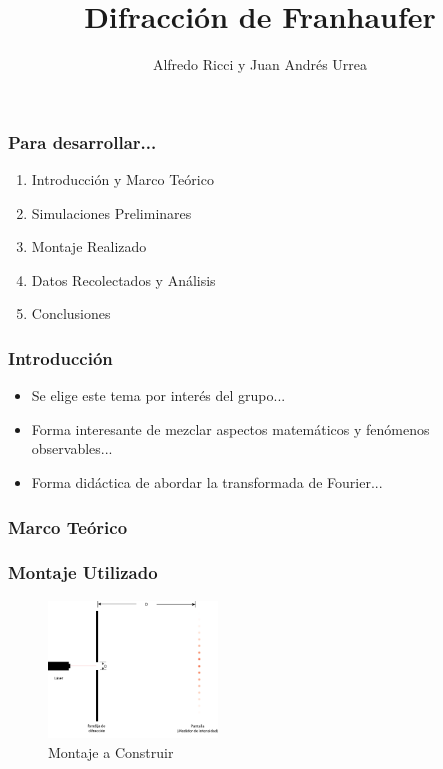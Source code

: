 \documentclass[12pt]{beamer}
\title{Difracción de Franhaufer}
\author{Alfredo Ricci y Juan Andrés Urrea}
\begin{document}
\frame{\titlepage}
\begin{frame}
\frametitle{Para desarrollar...}
\begin{block}{}
\begin{enumerate}
\item Introducción y Marco Teórico \pause
\item Simulaciones Preliminares \pause
\item Montaje Realizado \pause
\item Datos Recolectados y Análisis \pause
\item Conclusiones
\end{enumerate}
\end{block}
\end{frame}

\begin{frame}
\frametitle{Introducción}
\begin{block}{}
\begin{itemize}
\item Se elige este tema por interés del grupo... \pause
\item Forma interesante de mezclar aspectos matemáticos y fenómenos observables... \pause
\item Forma didáctica de abordar la transformada de Fourier...
\end{itemize}
\end{block}
\end{frame}

\begin{frame}
\frametitle{Marco Teórico}
\end{frame}

\begin{frame}
\frametitle{Montaje Utilizado}

\begin{figure}[htb]
\centering
\includegraphics[width=0.4\textwidth]{Montaje.png}
\caption{Montaje a Construir} \label{fig:montaje}
\end{figure}
\end{frame}
\end{document}
